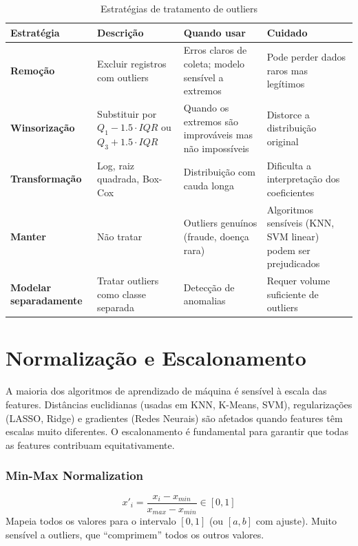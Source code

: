 \documentclass[12pt,a4paper]{article}
\begin{document}
\begin{table}[ht]
\centering
\caption{Estratégias de tratamento de outliers}
\label{tab:outliers}
\small
\begin{tabular}{>{\bfseries}p{2.8cm} p{3.5cm} p{3.5cm} p{3.2cm}}
\toprule
\textbf{Estratégia} & \textbf{Descrição} & \textbf{Quando usar} & \textbf{Cuidado} \\
\midrule
Remoção & Excluir registros com outliers & Erros claros de coleta; modelo sensível a extremos & Pode perder dados raros mas legítimos \\
\midrule
Winsorização & Substituir por $Q_1 - 1.5 \cdot IQR$ ou $Q_3 + 1.5 \cdot IQR$ & Quando os extremos são improváveis mas não impossíveis & Distorce a distribuição original \\
\midrule
Transformação & Log, raiz quadrada, Box-Cox & Distribuição com cauda longa & Dificulta a interpretação dos coeficientes \\
\midrule
Manter & Não tratar & Outliers genuínos (fraude, doença rara) & Algoritmos sensíveis (KNN, SVM linear) podem ser prejudicados \\
\midrule
Modelar separadamente & Tratar outliers como classe separada & Detecção de anomalias & Requer volume suficiente de outliers \\
\bottomrule
\end{tabular}
\end{table}

\section{Normalização e Escalonamento}

A maioria dos algoritmos de aprendizado de máquina é sensível à escala das features. Distâncias euclidianas (usadas em KNN, K-Means, SVM), regularizações (LASSO, Ridge) e gradientes (Redes Neurais) são afetados quando features têm escalas muito diferentes. O escalonamento é fundamental para garantir que todas as features contribuam equitativamente.

\subsubsection{Min-Max Normalization}
\[
x'_i = \frac{x_i - x_{min}}{x_{max} - x_{min}} \in [0, 1]
\]
Mapeia todos os valores para o intervalo $[0, 1]$ (ou $[a, b]$ com ajuste). Muito sensível a outliers, que ``comprimem'' todos os outros valores.
\end{document}
